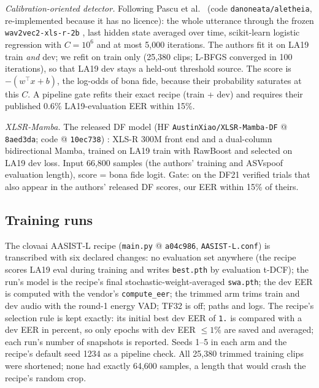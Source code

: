 \documentclass[10pt]{article}
\begin{document}
\emph{Calibration-oriented detector.} Following Pascu et al.\ \cite{pascu24_calibrated} (code \texttt{danoneata/aletheia},
re-implemented because it has no licence): the whole utterance through the frozen \texttt{wav2vec2-xls-r-2b}
\cite{babu21_xlsr}, last hidden state averaged over time, scikit-learn logistic regression with \(C=10^6\) and at most 5,000
iterations. The authors fit it on LA19 train \emph{and} dev; we refit on train only (25,380 clips; L-BFGS converged in 100
iterations), so that LA19 dev stays a held-out threshold source. The score is \(-(w^\top x+b)\), the log-odds of bona fide,
because their probability saturates at this \(C\). A pipeline gate refits their exact recipe (train + dev) and requires their
published 0.6\% LA19-evaluation EER within 15\%.

\emph{XLSR-Mamba.} The released DF model (HF \texttt{AustinXiao/XLSR-Mamba-DF} @ \texttt{8aed3da}; code @ \texttt{10ec738})
\cite{xiao25_xlsrmamba}: XLS-R 300M front end and a dual-column bidirectional Mamba, trained on LA19 train with RawBoost
\cite{tak22_rawboost} and selected on LA19 dev loss. Input 66,800 samples (the authors' training and ASVspoof evaluation
length), score = bona fide logit. Gate: on the DF21 verified trials that also appear in the authors' released DF scores, our
EER within 15\% of theirs.

\subsection{Training runs}
The clovaai AASIST-L recipe (\texttt{main.py} @ \texttt{a04c986}, \texttt{AASIST-L.conf}) is transcribed with six declared
changes: no evaluation set anywhere (the recipe scores LA19 eval during training and writes \texttt{best.pth} by evaluation
t-DCF); the run's model is the recipe's final stochastic-weight-averaged \texttt{swa.pth}; the dev EER is computed with the
vendor's \texttt{compute\_eer}; the trimmed arm trims train and dev audio with the round-1 energy VAD; TF32 is off; paths and
logs. The recipe's selection rule is kept exactly: its initial best dev EER of \texttt{1.} is compared with a dev EER in
percent, so only epochs with dev EER \(\le 1\%\) are saved and averaged; each run's number of snapshots is reported. Seeds 1--5
in each arm and the recipe's default seed 1234 as a pipeline check. All 25,380 trimmed training clips were shortened; none
had exactly 64,600 samples, a length that would crash the recipe's random crop.
\end{document}
